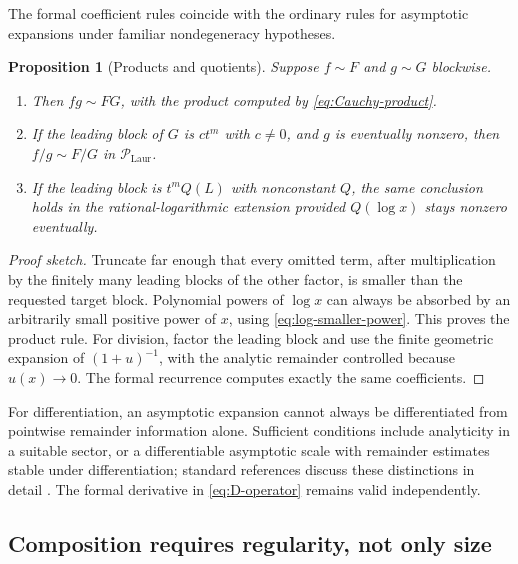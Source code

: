 \documentclass[11pt]{article}
\theoremstyle{pltheorem}
\newtheorem{proposition}[theorem]{Proposition}
\newcommand{\PLL}{\mathscr P_{\mathrm{Laur}}}
\begin{document}
The formal coefficient rules coincide with the ordinary rules for asymptotic expansions under familiar nondegeneracy hypotheses.

\begin{proposition}[Products and quotients]\label{prop:asymptotic-product-quotient}
Suppose \(f\sim F\) and \(g\sim G\) blockwise.
\begin{enumerate}[label=\textup{(\roman*)}]
\item Then \(fg\sim FG\), with the product computed by
\cref{eq:Cauchy-product}.
\item If the leading block of \(G\) is \(ct^m\) with \(c\ne0\), and \(g\) is eventually nonzero, then
\(f/g\sim F/G\) in \(\PLL\).
\item If the leading block is \(t^mQ(L)\) with nonconstant \(Q\), the same conclusion holds in the rational-logarithmic extension provided \(Q(\log x)\) stays nonzero eventually.
\end{enumerate}
\end{proposition}

\begin{proof}[Proof sketch]
Truncate far enough that every omitted term, after multiplication by the finitely many leading blocks of the other factor, is smaller than the requested target block.  Polynomial powers of \(\log x\) can always be absorbed by an arbitrarily small positive power of \(x\), using \cref{eq:log-smaller-power}.  This proves the product rule.  For division, factor the leading block and use the finite geometric expansion of
\((1+u)^{-1}\), with the analytic remainder controlled because \(u(x)\to0\).  The formal recurrence computes exactly the same coefficients.
\end{proof}

For differentiation, an asymptotic expansion cannot always be differentiated from pointwise remainder information alone.  Sufficient conditions include analyticity in a suitable sector, or a differentiable asymptotic scale with remainder estimates stable under differentiation; standard references discuss these distinctions in detail \cite{olver-asymptotics,debruijn}.  The formal derivative in \cref{eq:D-operator} remains valid independently.

\subsection{Composition requires regularity, not only size}
\end{document}

